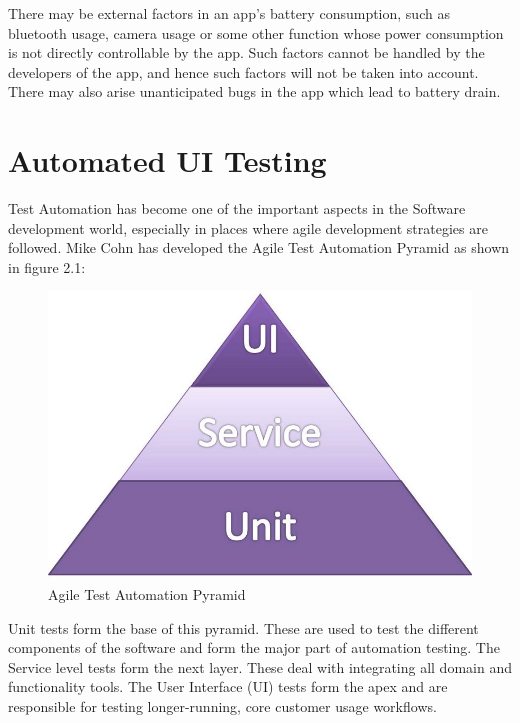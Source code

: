 There may be external factors in an app’s battery consumption, such as bluetooth usage, camera usage or some other function whose power consumption is not directly controllable by the app. Such factors cannot be handled by the developers of the app, and hence such factors will not be taken into account. There may also arise unanticipated bugs in the app which lead to battery drain. 

\section{Automated UI Testing}
Test Automation has become one of the important aspects in the Software development world, especially in places where agile development strategies are followed. Mike Cohn has developed the Agile Test Automation Pyramid\cite{pyramid} as shown in figure 2.1:
\begin{figure}[!h]
 	\begin{center}
		\includegraphics[scale=0.5]{pyramid}
		\caption{Agile Test Automation Pyramid}
	\end{center}
\end{figure}

Unit tests form the base of this pyramid. These are used to test the different components of the software and form the major part of automation testing. The Service level tests form the next layer. These deal with integrating all domain and functionality tools. The User Interface (UI) tests form the apex and are responsible for testing longer-running, core customer usage workflows.

